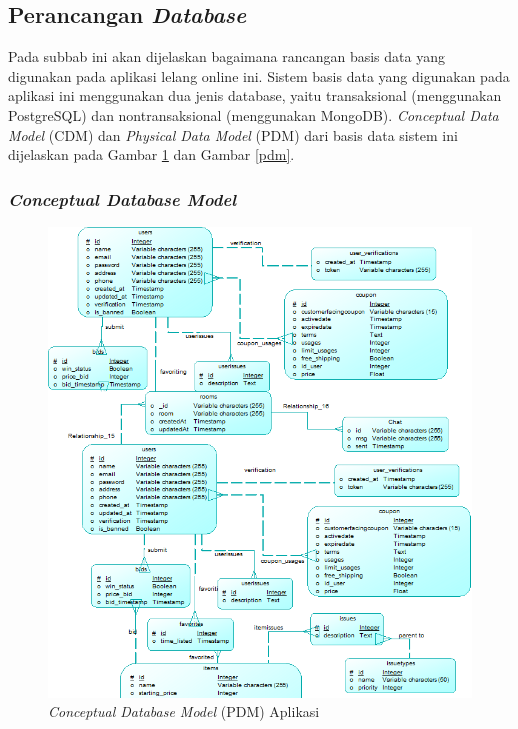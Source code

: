 
\subsection{Perancangan \textit{Database}}
Pada subbab ini akan dijelaskan bagaimana rancangan basis data yang digunakan pada aplikasi lelang online ini. Sistem basis data yang digunakan pada aplikasi ini menggunakan dua jenis database, yaitu transaksional (menggunakan PostgreSQL) dan nontransaksional (menggunakan MongoDB). \textit{Conceptual Data Model} (CDM) dan \textit{Physical Data Model }(PDM) dari basis data sistem ini dijelaskan pada Gambar \ref{cdm} dan Gambar \ref{pdm}.
	\subsubsection{\textit{Conceptual Database Model}}
	\begin{figure}[H]
		\centering
		\includegraphics[width=\textwidth]{images/bab3/db/cdm.png}
		\caption{\textit{Conceptual Database Model} (PDM) Aplikasi}
		\label{cdm}
	\end{figure}
	
	
